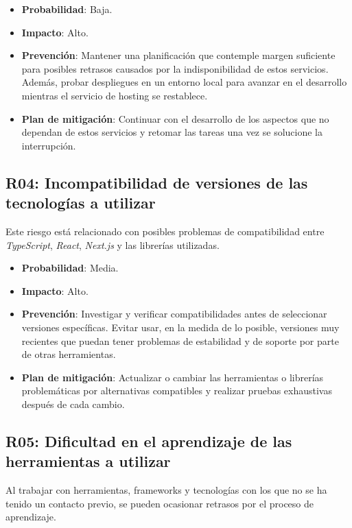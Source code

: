 \begin{itemize}
    \item \textbf{Probabilidad}: Baja.
    \item \textbf{Impacto}: Alto.
    \item \textbf{Prevención}: Mantener una planificación que contemple margen suficiente para posibles retrasos causados por la indisponibilidad de estos servicios. Además, probar despliegues en un entorno local para avanzar en el desarrollo mientras el servicio de hosting se restablece.
    \item \textbf{Plan de mitigación}: Continuar con el desarrollo de los aspectos que no dependan de estos servicios y retomar las tareas una vez se solucione la interrupción.
\end{itemize}

\subsection{R04: Incompatibilidad de versiones de las tecnologías a utilizar}
Este riesgo está relacionado con posibles problemas de compatibilidad entre \textit{TypeScript}, \textit{React}, \textit{Next.js} y las librerías utilizadas.

\begin{itemize}
    \item \textbf{Probabilidad}: Media.
    \item \textbf{Impacto}: Alto.
    \item \textbf{Prevención}: Investigar y verificar compatibilidades antes de seleccionar versiones específicas. Evitar usar, en la medida de lo posible, versiones muy recientes que puedan tener problemas de estabilidad y de soporte por parte de otras herramientas.
    \item \textbf{Plan de mitigación}: Actualizar o cambiar las herramientas o librerías problemáticas por alternativas compatibles y realizar pruebas exhaustivas después de cada cambio.
\end{itemize}

\subsection{R05: Dificultad en el aprendizaje de las herramientas a utilizar}
Al trabajar con herramientas, frameworks y tecnologías con los que no se ha tenido un contacto previo, se pueden ocasionar retrasos por el proceso de aprendizaje.

